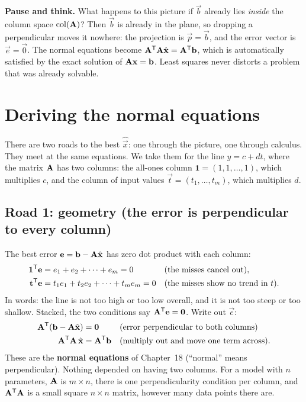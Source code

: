 \begin{recoverybox}
\textbf{Pause and think.} What happens to this picture if $\vec{b}$ already lies \emph{inside} the
column space $\operatorname{col}(\mathbf{A})$?
Then $\vec{b}$ is already in the plane, so dropping a perpendicular moves it nowhere: the projection is
$\vec{p} = \vec{b}$, and the error vector is $\vec{e} = \vec{0}$. The normal equations become
$\mathbf{A}^{\mathsf{T}}\mathbf{A}\hat{\mathbf{x}} = \mathbf{A}^{\mathsf{T}}\mathbf{b}$, which is automatically satisfied by the exact
solution of $\mathbf{A}\mathbf{x} = \mathbf{b}$. Least squares never distorts a problem that was already
solvable.
\end{recoverybox}

\section{Deriving the normal equations}\label{ch19:sec-derive}

There are two roads to the best $\hat{\vec{x}}$: one through the picture, one through calculus.
They meet at the same equations. We take them for the line $y=c+dt$, where the matrix $\mathbf{A}$ has
two columns: the all-ones column $\mathbf{1}=(1,1,\dots,1)$, which multiplies $c$, and the column of
input values $\vec{t}=(t_1,\dots,t_m)$, which multiplies $d$.

\subsection*{Road 1: geometry (the error is perpendicular to every column)}

The best error $\mathbf{e}=\mathbf{b}-\mathbf{A}\hat{\mathbf{x}}$ has zero dot product with each column:
\begin{align*}
  \mathbf{1}^{\mathsf{T}}\mathbf{e} &= e_1+e_2+\dots+e_m = 0
     && \text{(the misses cancel out)},\\
  \mathbf{t}^{\mathsf{T}}\mathbf{e} &= t_1e_1+t_2e_2+\dots+t_me_m = 0
     && \text{(the misses show no trend in $t$)}.
\end{align*}
In words: the line is not too high or too low overall, and it is not too steep or too shallow.
Stacked, the two conditions say $\mathbf{A}^{\mathsf{T}}\mathbf{e}=\mathbf{0}$. Write out $\vec{e}$:
\begin{align*}
  \mathbf{A}^{\mathsf{T}}(\mathbf{b}-\mathbf{A}\hat{\mathbf{x}}) &= \mathbf{0}
     && \text{(error perpendicular to both columns)}\\
  \mathbf{A}^{\mathsf{T}}\mathbf{A}\,\hat{\mathbf{x}} &= \mathbf{A}^{\mathsf{T}}\mathbf{b}
     && \text{(multiply out and move one term across).}
\end{align*}
These are the \textbf{normal equations} of Chapter~18 (``normal'' means perpendicular). Nothing
depended on having two columns. For a model with $n$ parameters, $\mathbf{A}$ is $m\times n$, there is
one perpendicularity condition per column, and $\mathbf{A}^{\mathsf{T}}\mathbf{A}$ is a small square $n\times n$
matrix, however many data points there are.

